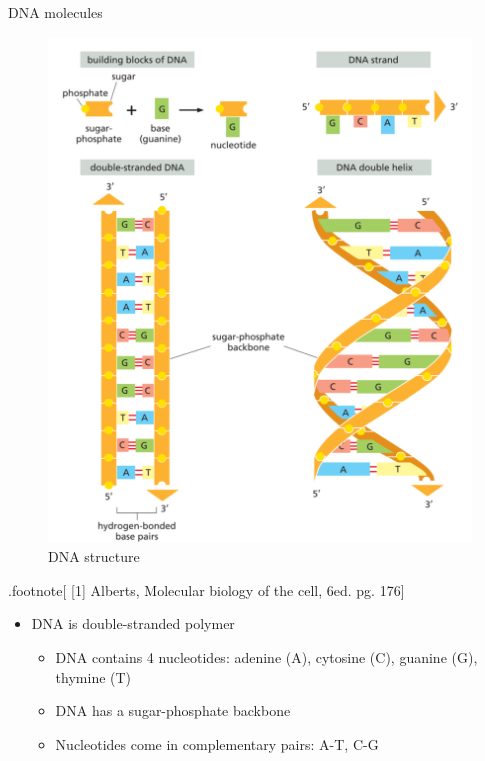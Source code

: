 \documentclass[
  ignorenonframetext,
]{beamer}
\providecommand{\tightlist}{%
  \setlength{\itemsep}{0pt}\setlength{\parskip}{0pt}}
\begin{document}
\begin{frame}{DNA molecules}
\protect\hypertarget{dna-molecules}{}

\begin{figure}
\centering
\includegraphics{dna-structure.png}
\caption{DNA structure}
\end{figure}

.footnote{[} {[}1{]} Alberts, Molecular biology of the cell, 6ed. pg.
176{]}

\begin{itemize}
\tightlist
\item
  DNA is double-stranded polymer

  \begin{itemize}
  \tightlist
  \item
    DNA contains 4 nucleotides: adenine (A), cytosine (C), guanine (G),
    thymine (T)
  \item
    DNA has a sugar-phosphate backbone
  \item
    Nucleotides come in complementary pairs: A-T, C-G
  \end{itemize}
\end{itemize}

\end{frame}
\end{document}
